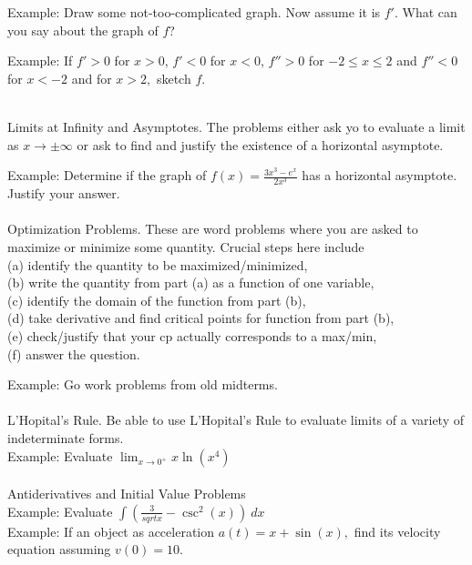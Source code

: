 \documentclass[11pt,fleqn]{article}
\begin{document}
Example: Draw some not-too-complicated graph. Now assume it is $f'$. What can you say about the graph of $f$?

Example: If $f' >0$ for $x>0$, $f' <0$ for $x<0$, $f'' > 0$ for $-2 \leq x \leq 2$ and $f'' < 0$ for $x<-2$ and for $x>2,$ sketch $f.$

\noindent {}\\
Limits at Infinity and Asymptotes. The problems either ask yo to evaluate a limit as $x \to \pm \infty$ or ask to find and justify the existence of a  horizontal asymptote.

Example: Determine if the graph of $f(x)=\frac{3x^3-e^x}{2x^3}$ has a horizontal asymptote. Justify your answer.\\

\noindent {}\\
Optimization Problems. These are word problems where you are asked to maximize or minimize some quantity. Crucial steps here include\\
 (a) identify the quantity to be maximized/minimized, \\
 (b) write the quantity from part (a) as a function of one variable,\\
 (c) identify the domain of the function from part (b), \\
 (d) take derivative and find critical points for function from part (b), \\
 (e) check/justify that your cp actually corresponds to a max/min,\\
 (f) answer the question.
 
 Example: Go work problems from old midterms.\\ 

\noindent {}\\
L'Hopital's Rule. Be able to use L'Hopital's Rule to evaluate limits of a variety of indeterminate forms.\\

Example: Evaluate $\lim_{x \to 0^+} x \ln(x^4)$\\

\noindent {}\\
Antiderivatives and Initial Value Problems \\

Example: Evaluate $\int (\frac{3}{sqrt{x}}-\csc^2(x)) \: dx$\\

Example: If an object as acceleration $a(t) = x + \sin(x),$ find its velocity equation assuming $v(0)=10.$\\
\end{document}
